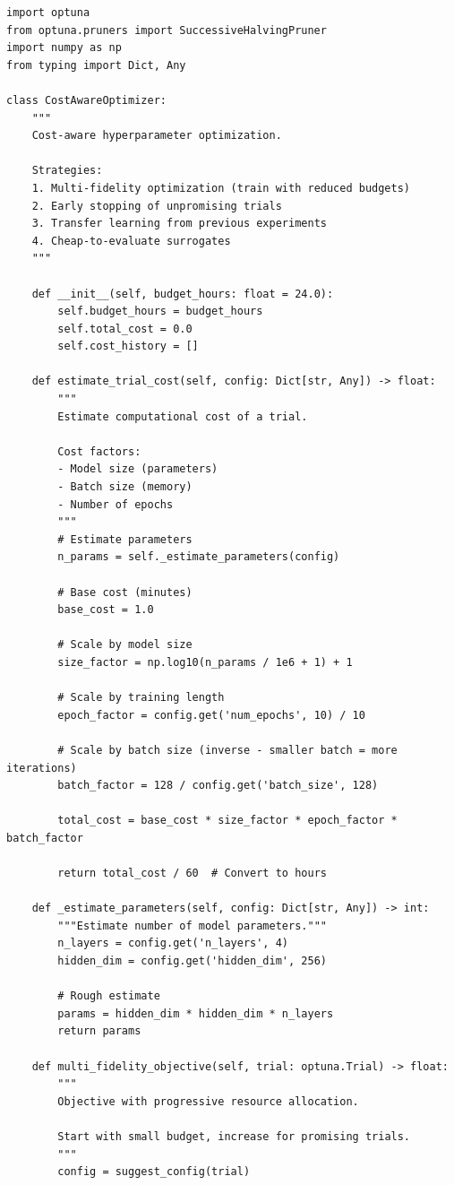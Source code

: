 \begin{lstlisting}[style=python, caption=Cost-efficient hyperparameter optimization]
import optuna
from optuna.pruners import SuccessiveHalvingPruner
import numpy as np
from typing import Dict, Any

class CostAwareOptimizer:
    """
    Cost-aware hyperparameter optimization.

    Strategies:
    1. Multi-fidelity optimization (train with reduced budgets)
    2. Early stopping of unpromising trials
    3. Transfer learning from previous experiments
    4. Cheap-to-evaluate surrogates
    """

    def __init__(self, budget_hours: float = 24.0):
        self.budget_hours = budget_hours
        self.total_cost = 0.0
        self.cost_history = []

    def estimate_trial_cost(self, config: Dict[str, Any]) -> float:
        """
        Estimate computational cost of a trial.

        Cost factors:
        - Model size (parameters)
        - Batch size (memory)
        - Number of epochs
        """
        # Estimate parameters
        n_params = self._estimate_parameters(config)

        # Base cost (minutes)
        base_cost = 1.0

        # Scale by model size
        size_factor = np.log10(n_params / 1e6 + 1) + 1

        # Scale by training length
        epoch_factor = config.get('num_epochs', 10) / 10

        # Scale by batch size (inverse - smaller batch = more iterations)
        batch_factor = 128 / config.get('batch_size', 128)

        total_cost = base_cost * size_factor * epoch_factor * batch_factor

        return total_cost / 60  # Convert to hours

    def _estimate_parameters(self, config: Dict[str, Any]) -> int:
        """Estimate number of model parameters."""
        n_layers = config.get('n_layers', 4)
        hidden_dim = config.get('hidden_dim', 256)

        # Rough estimate
        params = hidden_dim * hidden_dim * n_layers
        return params

    def multi_fidelity_objective(self, trial: optuna.Trial) -> float:
        """
        Objective with progressive resource allocation.

        Start with small budget, increase for promising trials.
        """
        config = suggest_config(trial)


\end{lstlisting}
